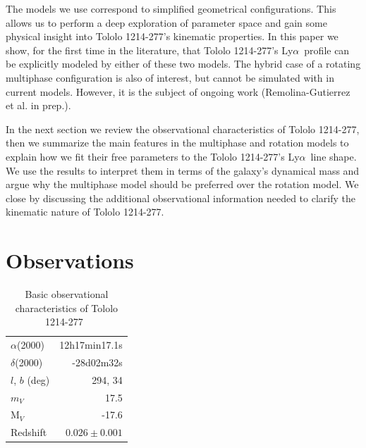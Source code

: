 \documentclass[a4paper,fleqn,usenatbib]{mnras}
\newcommand{\tol}{Tololo 1214-277}
\newcommand{\lya}{\ifmmode{{\rm Ly}\alpha}\else Ly$\alpha$\ \fi}
\begin{document}
The models we use correspond to simplified geometrical configurations.
This allows us to perform a deep exploration of parameter space and
gain some physical insight into \tol's kinematic properties.
In this paper we show, for the first time in the literature, that \tol's
\lya profile can be explicitly modeled by either of these two
models. 
The hybrid case of a rotating multiphase configuration is also of
interest, but cannot be simulated with in current models. 
However, it is the subject of ongoing work  (Remolina-Gutierrez et
al. in prep.). 

In the next section we review the observational characteristics of
\tol, then we summarize the main features in the multiphase and
rotation models to explain how we fit their free parameters 
to the \tol's \lya line shape.
We use the results to interpret them in terms of the galaxy's
dynamical mass and argue why the multiphase model should be preferred
over the rotation model.
We close by discussing the additional observational information needed
to clarify the kinematic nature of \tol. 


\section{Observations}


\begin{table}
\begin{center}
\begin{tabular}{lr}\hline
$\alpha$(2000)& 12h17min17.1s\\
$\delta$(2000)& -28d02m32s\\
$l$, $b$ (deg) & 294, 34\\
$m_V$ & 17.5\\
  M$_V$ & -17.6\\ 
Redshift & $0.026\pm0.001$ \\\hline
\end{tabular}
\end{center}
\caption{Basic observational characteristics of \tol\ 
  \citep{Thuan97}\label{obstable}} 
\end{table}
\end{document}
